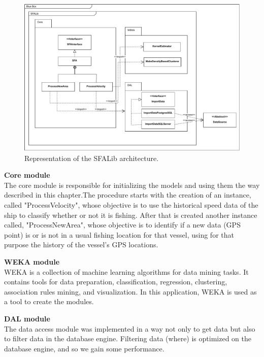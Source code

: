 \begin{figure}[]
\centering
\includegraphics[width=1.0\linewidth]{Chapters/img/SFALib_Prof.pdf}
\caption{Representation of the SFALib architecture.}
\label{fig:SFALib_Prof}
\end{figure}



\textbf{Core module} \\The core module is responsible for initializing the models and using them the way described in this chapter.The procedure starts with the creation of an instance, called  "ProcessVelocity", whose objective is to use the historical speed data of the ship to classify whether or not it is fishing. After that is created another instance called, "ProcessNewArea", whose objective is to identify if a new data (GPS point) is or is not in a usual fishing location for that vessel, using for that purpose the history of the vessel's GPS locations.

\textbf{WEKA module} \\WEKA is a collection of machine learning algorithms for data mining tasks. It contains tools for data preparation, classification, regression, clustering, association rules mining, and visualization. In this application, WEKA is used as a tool to create the modules.

\textbf{DAL module} \\The data access module was implemented in a way not only to get data but also to filter data in the database engine. Filtering data (where) is optimized on the database engine, and so we gain some performance.




